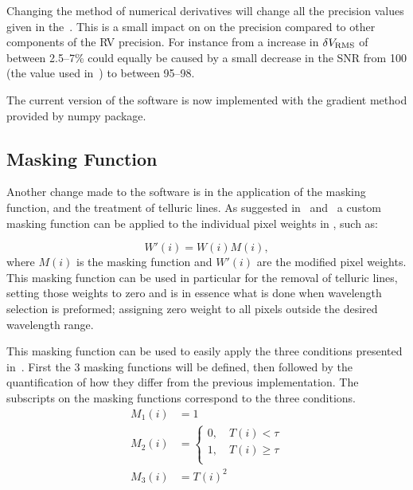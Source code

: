 Changing the method of numerical derivatives will change all the precision values given in the~\citet{figueira_radial_2016}. This is a small impact on on the precision compared to other components of the {RV} precision. For instance from  a increase in \(\delta V_{\textrm{RMS}}\) of between 2.5--7\%  could equally be caused by a small decrease in the {SNR} from 100 (the value used in~\citet{figueira_radial_2016}) to between 95--98.

The current version of the software is now implemented with the gradient method provided by numpy package.

\subsection{Masking Function}
\label{subsec:masking_function}
Another change made to the software is in the application of the masking function, and the treatment of telluric lines. As suggested in~\cite{connes_absolute_1985} and~\cite{bouchy_fundamental_2001} a custom masking function can be applied to the individual pixel weights in , such as:

\[W'(i) = W(i)M(i),\label{eq:mask_function}\] where \(M(i)\) is the masking function and \(W'(i)\) are the modified pixel weights.
This masking function can be used in particular for the removal of telluric lines, setting those weights to zero and is in essence what is done when wavelength selection is preformed; assigning zero weight to all pixels outside the desired wavelength range.

This masking function can be used to easily apply the three conditions presented in~\citet{figueira_radial_2016}. First  the 3 masking functions will be defined, then followed by the quantification of how they differ from the previous implementation. The subscripts on the masking functions correspond to the three conditions.
\begin{align}
M_1(i) &= 1 \label{eq:mask1}\\
M_2(i) &= \begin{cases}
0, \hspace{1em} T(i) < \tau\\
1, \hspace{1em} T(i) \ge \tau\\
\end{cases}\label{eq:mask2}\\
M_3(i) &= {T(i)}^{2} \label{eq:mask3}
\end{align}


